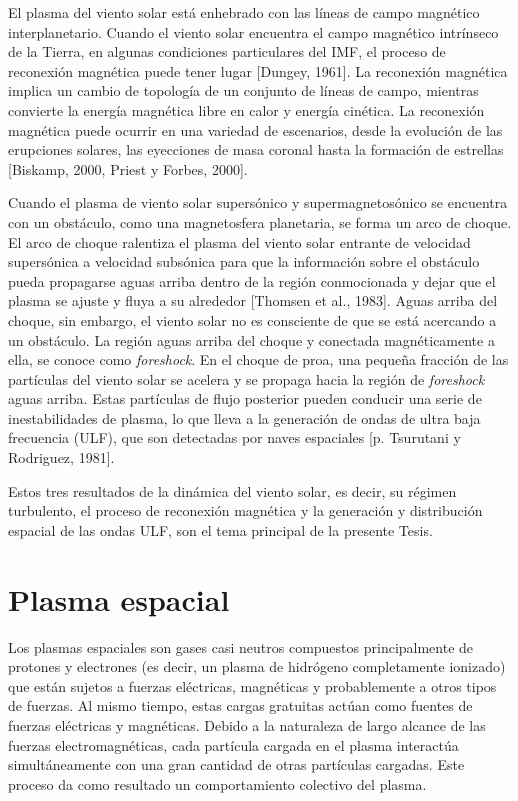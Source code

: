 El plasma del viento solar está enhebrado con las líneas de campo
magnético interplanetario. Cuando el viento solar encuentra el campo
magnético intrínseco de la Tierra, en algunas condiciones particulares
del IMF, el proceso de reconexión magnética puede tener lugar [Dungey,
  1961]. La reconexión magnética implica un cambio de topología de un
conjunto de líneas de campo, mientras convierte la energía magnética
libre en calor y energía cinética. La reconexión magnética puede
ocurrir en una variedad de escenarios, desde la evolución de las
erupciones solares, las eyecciones de masa coronal hasta la formación
de estrellas [Biskamp, 2000, Priest y Forbes, 2000].

Cuando el plasma de viento solar supersónico y supermagnetosónico se
encuentra con un obstáculo, como una magnetosfera planetaria, se forma
un arco de choque. El arco de choque ralentiza el plasma del viento
solar entrante de velocidad supersónica a velocidad subsónica para que
la información sobre el obstáculo pueda propagarse aguas arriba dentro
de la región conmocionada y dejar que el plasma se ajuste y fluya a su
alrededor [Thomsen et al., 1983]. Aguas arriba del choque, sin
embargo, el viento solar no es consciente de que se está acercando a
un obstáculo. La región aguas arriba del choque y conectada
magnéticamente a ella, se conoce como \emph{foreshock}. En el choque
de proa, una pequeña fracción de las partículas del viento solar se
acelera y se propaga hacia la región de \emph{foreshock} aguas
arriba. Estas partículas de flujo posterior pueden conducir una serie
de inestabilidades de plasma, lo que lleva a la generación de ondas de
ultra baja frecuencia (ULF), que son detectadas por naves espaciales
[p. Tsurutani y Rodriguez, 1981].

Estos tres resultados de la dinámica del viento solar, es decir, su
régimen turbulento, el proceso de reconexión magnética y la generación
y distribución espacial de las ondas ULF, son el tema principal de la
presente Tesis.



\section{Plasma espacial}

Los plasmas espaciales son gases casi neutros compuestos
principalmente de protones y electrones (es decir, un plasma de
hidrógeno completamente ionizado) que están sujetos a fuerzas
eléctricas, magnéticas y probablemente a otros tipos de fuerzas. Al
mismo tiempo, estas cargas gratuitas actúan como fuentes de fuerzas
eléctricas y magnéticas. Debido a la naturaleza de largo alcance de
las fuerzas electromagnéticas, cada partícula cargada en el plasma
interactúa simultáneamente con una gran cantidad de otras partículas
cargadas. Este proceso da como resultado un comportamiento colectivo
del plasma.

